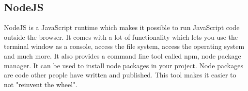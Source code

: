 \subsection{NodeJS}
NodeJS is a JavaScript runtime which makes it possible to run JavaScript code outside the browser. It comes with a lot of functionality which lets you use the terminal window as a console, access the file system, access the operating system and much more. It also provides a command line tool called npm, node package manager. It can be used to install node packages in your project. Node packages are code other people have written and published. This tool makes it easier to not "reinvent the wheel".